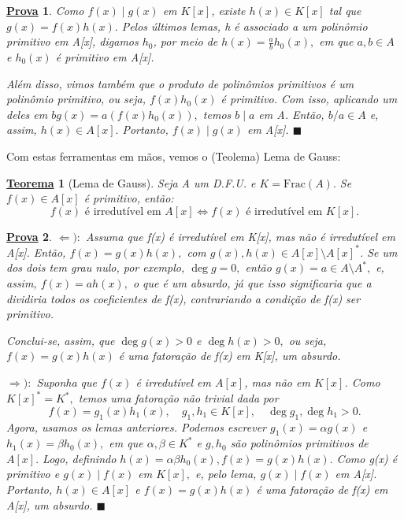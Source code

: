 \documentclass{article}
\newtheorem*{theorem*}{\underline{Teorema}}
\newtheorem*{proof*}{\underline{Prova}}
\renewcommand\qedsymbol{$\blacksquare$}
\begin{document}
\begin{proof*}
  Como \(f(x)\mid g(x)\) em \(K[x]\), existe \(h(x)\in K[x]\) tal que \(g(x) = f(x)h(x).\) Pelos últimos lemas,
 h é associado a um polinômio primitivo em A[x], digamos \(h_{0}\), por meio de \(h(x) = \frac{a}{b}h_{0}(x),\) em que \(a, b\in A\) e 
  \(h_{0}(x)\) é primitivo em A[x].

  Além disso, vimos também que o produto de polinômios primitivos é um polinômio primitivo, ou seja, \(f(x)h_{0}(x)\) é primitivo. Com isso,
aplicando um deles em \(bg(x) = a(f(x)h_{0}(x)),\) temos \(b\mid a\) em A. Então, \(b/a\in A\) e, assim, \(h(x)\in A[x].\)
Portanto, \(f(x)\mid g(x)\) em A[x]. \qedsymbol
\end{proof*}
  Com estas ferramentas em mãos, vemos o (Teolema) Lema de Gauss:
\begin{theorem*}[Lema de Gauss]
  Seja A um D.F.U. e \(K = \mathrm{Frac}(A).\) Se \(f(x)\in A[x]\) é primitivo, então:
    \[
      f(x) \text{ é irredutível em }A[x] \Longleftrightarrow f(x) \text{ é irredutível em }K[x].
    \]
\end{theorem*}
\begin{proof*}
  \(\Leftarrow ):\) Assuma que f(x) é irredutível em K[x], mas não é irredutível em A[x]. Então, \(f(x) = g(x)h(x),\) com 
 \(g(x), h(x)\in A[x]\setminus{A[x]^{*}}\). Se um dos dois tem grau nulo, por exemplo, \(\deg{g} = 0, \) então
  \(g(x) = a\in A\setminus{A^{*}},\) e, assim, \(f(x) = ah(x),\) o que é um absurdo, já que isso significaria que 
 a dividiria todos os coeficientes de f(x), contrariando a condição de f(x) ser primitivo.
  
  Conclui-se, assim, que \(\deg{g(x)} > 0\) e \(\deg{h(x)} > 0,\) ou seja, \(f(x) = g(x)h(x)\) é uma fatoração de 
f(x) em K[x], um absurdo.

  \(\Rightarrow ):\) Suponha que \(f(x)\) é irredutível em \(A[x]\), mas não em \(K[x]\). Como \(K[x]^{*} = K^{*},\) temos uma
fatoração não trivial dada por 
  \[
    f(x) = g_{1}(x)h_{1}(x),\quad g_{1}, h_{1}\in K[x],\quad \deg{g_{1}}, \deg{h_{1}} > 0.
  \]
  Agora, usamos os lemas anteriores. Podemos escrever \(g_{1}(x) = \alpha g(x)\) e \(h_{1}(x) = \beta h_{0}(x),\) em que \(\alpha , \beta \in K^{*}\)
e \(g, h_{0}\) são polinômios primitivos de \(A[x].\) Logo, definindo \(h(x) = \alpha \beta h_{0}(x), f(x) = g(x)h(x).\) Como g(x) é primitivo e 
\(g(x)\mid f(x)\) em \(K[x],\) e, pelo lema, \(g(x)\mid f(x)\) em A[x]. Portanto, \(h(x)\in A[x]\) e \(f(x) = g(x)h(x)\) é uma fatoração de f(x) em A[x],
um absurdo. \qedsymbol
\end{proof*}
\end{document}
